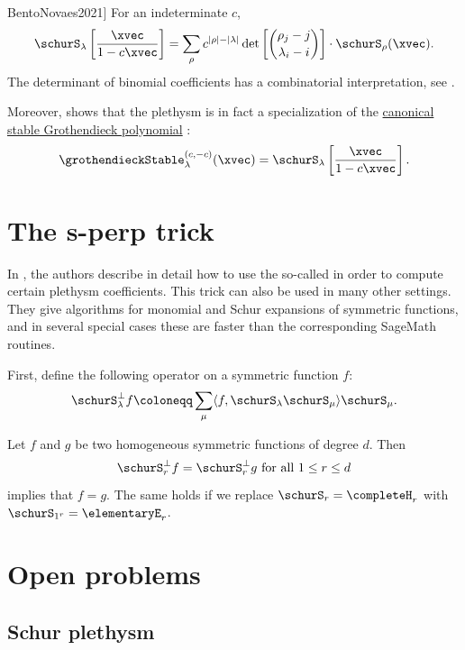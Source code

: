 \begin{proposition}[See \cite[Appendix~B]{BentoNovaes2021}]
For an indeterminate $c$,
\[
\schurS_\lambda\left[ \frac{\xvec}{1- c \xvec} \right] = \sum_{\rho} c^{|\rho|-|\lambda|}
\det\left[  \binom{ \rho_j-j }{\lambda_i-i}   \right] \cdot \schurS_\rho(\xvec).
\]
The determinant of binomial coefficients has a combinatorial interpretation, see \cite{GesselViennot1985}.
\end{proposition}
Moreover,  shows that the plethysm is in fact a
specialization of the \hyperref[grothendieckCanonical]{canonical stable
Grothendieck polynomial} \cite{Yeliussizov2017}:
\[
   \grothendieckStable^{(c,-c)}_\lambda(\xvec)
   = \schurS_\lambda\left[ \frac{\xvec}{1- c \xvec} \right].
\]


\section[plethysmComputation]{The s-perp trick}

In \cite{ColmenarejoOrellanaSaliolaSchillingZabrocki2022x}, the authors
describe in detail how to use the so-called
\label{sPerpTrick}
in order to compute certain plethysm coefficients.
This trick can also be used in many other settings.  They give algorithms for
monomial and Schur expansions of symmetric functions, and in several special
cases these are faster than the corresponding SageMath routines.

First, define the following operator on a symmetric function $f$:
\[
 \schurS_\lambda^{\perp} f \coloneqq \sum_{\mu} \langle f , \schurS_\lambda \schurS_\mu \rangle \schurS_\mu.
\]

\begin{proposition}
Let $f$ and $g$ be two homogeneous symmetric functions of degree $d$.
Then
\[
 \schurS_r^{\perp} f = \schurS_r^{\perp} g \text{ for all $1\leq r \leq d$}
\]
implies that $f=g$.  The same holds if we replace
$\schurS_r = \completeH_r$ with $\schurS_{1^r} = \elementaryE_r$.
\end{proposition}


\section[plethysmProblems]{Open problems}

\subsection[plethysmWithSchur]{Schur plethysm}

